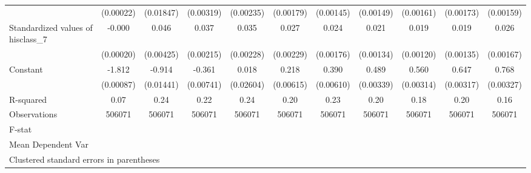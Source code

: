 {\begin{tabular}{l*{10}{c}}
                    &   (0.00022)         &   (0.01847)         &   (0.00319)         &   (0.00235)         &   (0.00179)         &   (0.00145)         &   (0.00149)         &   (0.00161)         &   (0.00173)         &   (0.00159)         \\
Standardized values of hisclass\_7&      -0.000         &       0.046\sym{***}&       0.037\sym{***}&       0.035\sym{***}&       0.027\sym{***}&       0.024\sym{***}&       0.021\sym{***}&       0.019\sym{***}&       0.019\sym{***}&       0.026\sym{***}\\
                    &   (0.00020)         &   (0.00425)         &   (0.00215)         &   (0.00228)         &   (0.00229)         &   (0.00176)         &   (0.00134)         &   (0.00120)         &   (0.00135)         &   (0.00167)         \\
Constant            &      -1.812\sym{***}&      -0.914\sym{***}&      -0.361\sym{***}&       0.018         &       0.218\sym{***}&       0.390\sym{***}&       0.489\sym{***}&       0.560\sym{***}&       0.647\sym{***}&       0.768\sym{***}\\
                    &   (0.00087)         &   (0.01441)         &   (0.00741)         &   (0.02604)         &   (0.00615)         &   (0.00610)         &   (0.00339)         &   (0.00314)         &   (0.00317)         &   (0.00327)         \\
\hline
R-squared           &        0.07         &        0.24         &        0.22         &        0.24         &        0.20         &        0.23         &        0.20         &        0.18         &        0.20         &        0.16         \\
Observations        &      506071         &      506071         &      506071         &      506071         &      506071         &      506071         &      506071         &      506071         &      506071         &      506071         \\
F-stat              &                     &                     &                     &                     &                     &                     &                     &                     &                     &                     \\
Mean Dependent Var  &                     &                     &                     &                     &                     &                     &                     &                     &                     &                     \\
\hline\hline
\multicolumn{11}{l}{\footnotesize Clustered standard errors in parentheses}\\
\end{tabular}
}
